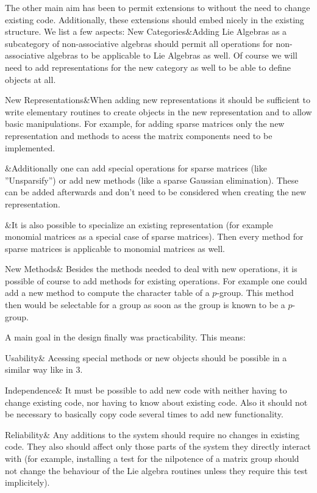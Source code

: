
The other main aim has been to permit extensions to {\GAP} without the need to
change existing code. Additionally, these extensions should embed nicely in
the existing structure. We list a few aspects:
\beginitems
New Categories&Adding Lie Algebras as a subcategory of non-associative
algebras should permit all operations for non-associative algebras to be
applicable to Lie Algebras as well. Of course we will need to add
representations for the new category as well to be able to define objects at
all.

New Representations&When adding new representations it should be
sufficient to write elementary routines to create objects in the new
representation and to allow basic manipulations. For example, for adding
sparse matrices only the new representation and methods to acess the
matrix components need to be implemented.

&Additionally one can add special operations for sparse matrices (like
''Unsparsify'') or add new methods (like a sparse Gaussian elimination).
These can be added afterwards and don't need to be considered when
creating the new representation.

&It is also possible to specialize an existing representation (for example
monomial matrices as a special case of sparse matrices). Then every method
for sparse matrices is applicable to monomial matrices as well.

New Methods& Besides the methods needed to deal with new
operations, it is possible of course to add methods for existing operations.
For example one could add a new method to compute the character table of a
$p$-group. This method then would be selectable for a group as soon as the
group is known to be a $p$-group.
\enditems


A main goal in the design finally was practicability. This means:

\beginitems
Usability&
Acessing special methods or new objects should be possible in a similar way
like in {\GAP} 3.

Independence& 
It must be possible to add new code with neither having to change existing
code, nor having to know about existing code. Also it should not be
necessary to basically copy code several times to add new functionality.

Reliability&
Any additions to the system should require no changes in existing code. They
also should affect only those parts of the system they directly interact
with (for example, installing a test for the nilpotence of a matrix group
should not change the behaviour of the Lie algebra routines unless they
require this test implicitely).

